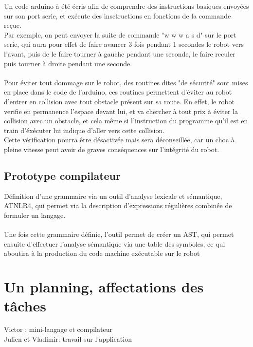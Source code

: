 \documentclass[a4paper]{article}
\begin{document}
Un code arduino à été écris afin de comprendre des instructions basiques envoyées sur son port serie, et exécute des insctructions en fonctions de la commande reçue.\\
Par exemple, on peut envoyer la suite de commande "w w w a s d" sur le port serie, qui aura pour effet de faire avancer 3 fois pendant 1 secondes le robot vers l'avant, puis de le faire tourner à gauche pendant une seconde, le faire reculer puis tourner à droite pendant une seconde.\\

\paragraph{}
Pour éviter tout dommage sur le robot, des routines dites "de sécurité" sont mises en place dans le code de l'arduino, ces routines permettent d'éviter au robot d'entrer en collision avec tout obstacle présent sur sa route. En effet, le robot verifie en permanence l'espace devant lui, et va chercher à tout prix à éviter la collision avec un obstacle, et cela même si l'instruction du programme qu'il est en train d'éxécuter lui indique d'aller vers cette collision.\\
Cette vérification pourra être désactivée mais sera déconseillée, car un choc à pleine vitesse peut avoir de graves conséquences sur l'intégrité du robot.

\subsection{Prototype compilateur}
Définition d’une grammaire via un outil d’analyse lexicale et sémantique, ATNLR4, qui permet via la description d’expressions régulières combinée de formuler un langage.\\
\\
Une fois cette grammaire définie, l’outil permet de créer un AST, qui permet ensuite d’effectuer l’analyse sémantique via une table des symboles, ce qui aboutira à la production du code machine exécutable sur le robot
\section{Un planning, affectations des tâches}

Victor : mini-langage et compilateur\\
Julien et Vladimir: travail sur l’application\\

\vfill\eject


\end{document}
